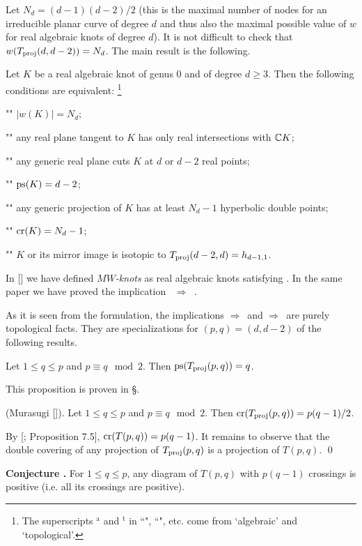 \smallskip
Let $N_d = (d-1)(d-2)/2$
(this is the maximal number of nodes for an irreducible planar curve
of degree $d$ and thus also the maximal possible value of $w$ for
real algebraic knots of degree $d$).
It is not difficult to check that $w(T_{\operatorname{proj}}(d,d-2))=N_d$.
The main result is the following.

Let $K$ be a real algebraic knot of genus $0$ and of degree $d\ge 3$.
Then the following conditions are equivalent:
\footnote{The superscripts ${}^{\text{a}}$ and ${}^{\text{t}}$ in ``\CondPSA", ``\CondPS", etc.
come from `algebraic' and `topological'.}
\roster
\item"\CondW"   $|w(K)|=N_d$;
\item"\CondH"   any real plane tangent to $K$ has only real intersections with $\Bbb C K$;
\item"\CondPSA" any generic real plane cuts $K$ at $d$ or $d-2$ real points;
\item"\CondPS"  $\operatorname{ps}(K)=d-2$;
\item"\CondCrA" any generic projection of $K$ has at least $N_d-1$ hyperbolic double points;
\item"\CondCr"  $\operatorname{cr}(K)=N_d-1$;
\item"\CondT"   $K$ or its mirror image is isotopic to $T_{\operatorname{proj}}(d-2,d)=h_{d-1,1}$.
\endroster
\endproclaim

In [] we have defined {\it $MW$-knots} as real algebraic knots
satisfying \CondW. In the same paper we have proved the implication
\CondW~$\Rightarrow$~\CondT.  %

As it is seen from the formulation, the implications \CondT$\Rightarrow$\CondPS\ and
\CondT$\Rightarrow$\CondCr\ are purely topological facts. They are specializations
for $(p,q)=(d,d-2)$ of the following results.

  Let $1\le q\le p$ and $p\equiv q\mod2$. Then $\operatorname{ps}(T_{\operatorname{proj}}(p,q))=q$.
\endproclaim

This proposition is proven in \S\sectPS.

 {\rm(Murasugi [])}. Let $1\le q\le p$ and $p\equiv q\mod2$.
Then $\operatorname{cr}(T_{\operatorname{proj}}(p,q))=p(q-1)/2$.
\endproclaim

 By [; Proposition 7.5],
$\operatorname{cr}(T(p,q))=p(q-1)$. It remains to observe that the double covering of
any projection of $T_{\operatorname{proj}}(p,q)$ is a projection of $T(p,q)$. \qed
\enddemo

\noindent
{\bf Conjecture \conjMurasugi. } For $1\le q\le p$, any diagram of $T(p,q)$ with $p(q-1)$ crossings
is positive (i.e. all its crossings are positive).
\smallskip

